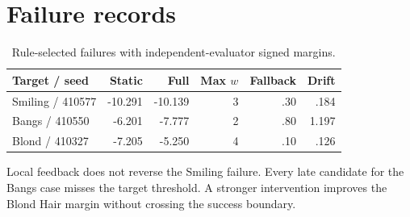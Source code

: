 \documentclass[10pt,twocolumn,letterpaper]{article}
\begin{document}
\section{Failure records}

\begin{table}[ht]
\caption{Rule-selected failures with independent-evaluator signed margins.}
\centering
\scriptsize
\setlength{\tabcolsep}{2.7pt}
\begin{tabular}{@{}lrrrrr@{}}
\toprule
Target / seed & Static & Full & Max $w$ & Fallback & Drift \\
\midrule
Smiling / 410577 & -10.291 & -10.139 & 3 & .30 & .184 \\
Bangs / 410550 & -6.201 & -7.777 & 2 & .80 & 1.197 \\
Blond / 410327 & -7.205 & -5.250 & 4 & .10 & .126 \\
\bottomrule
\end{tabular}
\end{table}

Local feedback does not reverse the Smiling failure. Every late candidate for
the Bangs case misses the target threshold. A stronger intervention improves
the Blond Hair margin without crossing the success boundary.
\fi
\end{document}
